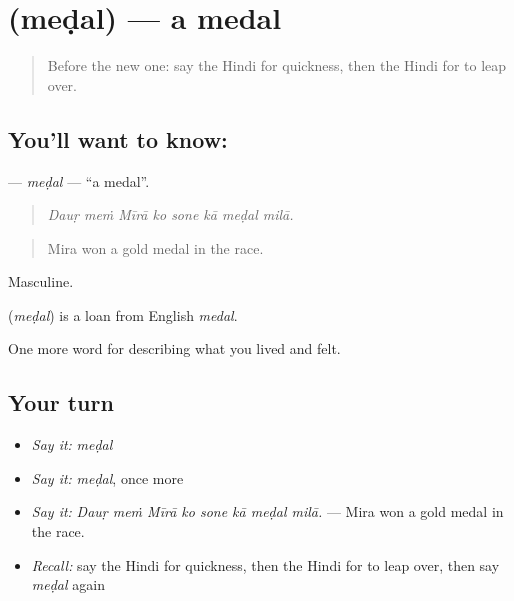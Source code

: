 \section[\texorpdfstring{\hi{मेडल} (meḍal)}{मेडल (meḍal)}]{ (meḍal) — a medal}

\label{lesson:HI-C535-medal}



\begin{quote}
Before the new one: say the Hindi for quickness, then the Hindi for to leap over.
\end{quote}

\subsection*{You'll want to know: }
\textbf{} — \emph{meḍal} — \textquotedblleft{}a medal\textquotedblright{}.

\begin{quote}
       
\end{quote}

\begin{quote}
\emph{Dauṛ meṁ Mīrā ko sone kā meḍal milā.}
\end{quote}

\begin{quote}
Mira won a gold medal in the race.
\end{quote}

Masculine.

\begin{cousinweb}
\textbf{} (\emph{meḍal}) is a loan from English \emph{medal}.
\end{cousinweb}

\begin{grammarlens}[title={What you've built}]
One more word for describing what you lived and felt.
\end{grammarlens}

\subsection*{Your turn}
\begin{itemize}
\raggedright
  \item \emph{Say it:} \emph{meḍal}
  \item \emph{Say it:} \emph{meḍal}, once more
  \item \emph{Say it:} \emph{Dauṛ meṁ Mīrā ko sone kā meḍal milā.} — Mira won a gold medal in the race.
  \item \emph{Recall:} say the Hindi for quickness, then the Hindi for to leap over, then say \emph{meḍal} again
\end{itemize}

